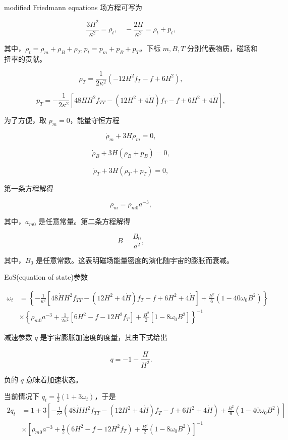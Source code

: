 \documentclass[aps,prl,preprint,groupedaddress]{revtex4-2}
\begin{document}
modified Friedmann equations 场方程可写为

$$
\frac{3 H^2 }{\kappa^2 } = \rho_t,\quad
-\frac{2\dot{H} }{\kappa^2 }  = \rho_t + p_t,
$$

其中，$\rho_t=\rho_m+\rho_B+\rho_T,p_t=p_m+p_B+p_T$，下标 $m,B,T$ 分别代表物质，磁场和扭率的贡献。

$$
\rho_T = \frac{1 }{2\kappa^2 } \left(-12 H^2 f_T - f + 6H^2 \right),
$$

$$
p_T = -\frac{1 }{2\kappa^2 } \left[48\dot{H}H^2 f_{TT} - \left(12 H^2 + 4\dot{H} \right) f_T - f + 6 H^2 + 4\dot{H} \right],
$$

为了方便，取 $p_m=0$，能量守恒方程

$$
\dot{\rho}_m + 3H \rho_m = 0,
$$

$$
\dot{\rho}_B + 3H\left(\rho_B + p_B \right) = 0,
$$

$$
\dot{\rho}_T + 3H\left(\rho_T + p_T \right) = 0,
$$

第一条方程解得

$$
\rho_m = \rho_{m0} a^{-3},
$$

其中，$a_{m0}$ 是任意常量。第二条方程解得

$$
B=\frac{B_0}{a^2},
$$

其中，$B_0$ 是任意常数。这表明磁场能量密度的演化随宇宙的膨胀而衰减。

EoS(equation of state)参数

$$
\begin{aligned}
    \omega_t
    &=\left\{-\frac{1 }{\kappa^2 } \left[48\dot{H}H^2 f_{TT} - \left(12 H^2 + 4\dot{H} \right) f_T - f + 6 H^2 + 4\dot{H} \right] + \frac{B^2 }{6 } \left(1-40\omega_0 B^2 \right) \right\} \\
    &\times \left\{\rho_{m0} a^{-3} + \frac{1 }{2\kappa^2 } \left[6 H^2 - f-12 H^2 f_T \right] + \frac{B^2 }{2 } \left[1-8\omega_0 B^2 \right] \right\}^{-1}
    \end{aligned}
$$

减速参数 $q$ 是宇宙膨胀加速度的度量，其由下式给出

$$
q = -1 - \frac{\dot{H} }{H^2 } .
$$

负的 $q$ 意味着加速状态。

当前情况下 $q_t=\frac{1}{2}(1+3\omega_t)$，于是
$$
\begin{aligned}
    2q_t
    &=1 + 3\left[-\frac{1 }{\kappa^2 } \left(48\dot{H} H^2 f_{TT} - \left(12 H^2 + 4\dot{H} \right) f_T - f + 6H^2 + 4\dot{H} \right) + \frac{B^2 }{6 } \left(1-40\omega_0 B^2 \right) \right] \\
    &\times \left[\rho_{m0}a^{-3} + \frac{1 }{2 } \left(6H^2-f-12H^2 f_T \right) + \frac{B^2 }{2 } \left(1-8\omega_0 B^2 \right) \right]^{-1}
\end{aligned}
$$
\end{document}
